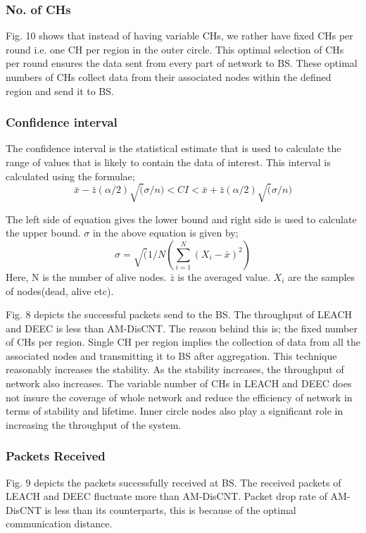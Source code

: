 \documentclass[journal]{IEEEtran}
\begin{document}
\subsubsection{No. of CHs}
 Fig. 10 shows that instead of having variable CHs, we rather have fixed CHs per round i.e. one CH per region in the outer circle. This optimal selection of CHs per round ensures the data sent from every part of network to BS. These optimal numbers of CHs collect data from their associated nodes within the defined region and send it to BS.


\subsubsection{Confidence interval}
The confidence interval is the statistical estimate that is used to calculate the range of values that is likely to contain the data of interest. This interval is calculated using the formulae;
      \begin{equation}
  \bar{x}-\bar{z}(\alpha/2)\surd(\sigma/n) < CI <  \bar{x}+\bar{z}(\alpha/2)\surd(\sigma/n)
      \end{equation}

  The left side of equation gives the lower bound and right side is used to calculate the upper bound. $\sigma$ in the above equation is given by;
      \begin{equation}
  \sigma=\surd(1/N(\sum\limits_{i=1}^N (X_i-\bar{x})^2)
      \end{equation}
  Here, N is the number of alive nodes. $\bar{z}$ is the averaged value. $X_i$ are the samples of nodes(dead, alive etc).

 Fig. 8 depicts the successful packets send to the BS. The throughput of LEACH and DEEC is less than AM-DisCNT. The reason behind this is; the fixed number of CHs per region. Single CH per region implies the collection of data from all the associated nodes and transmitting it to BS after aggregation. This technique reasonably increases the stability. As the stability increases, the throughput of network also increases. The variable number of CHs in LEACH and DEEC does not insure the coverage of whole network and reduce the efficiency of network in terms of stability and lifetime. Inner circle nodes also play a significant role in increasing the throughput of the system.

 \subsubsection{Packets Received}
 Fig. 9 depicts the packets successfully received at BS. The received packets of LEACH and DEEC fluctuate more than AM-DisCNT. Packet drop rate of AM-DisCNT is less than its counterparts, this is because of the optimal communication distance.
\end{document}
